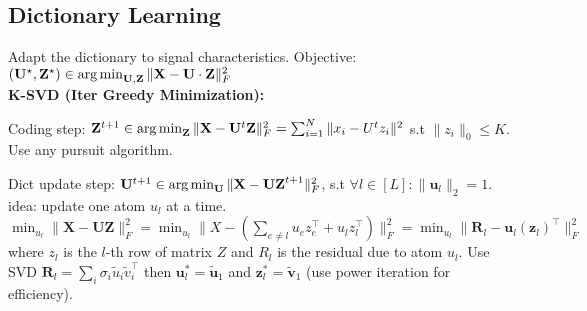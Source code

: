 \subsection*{Dictionary Learning}
Adapt the dictionary to signal characteristics. Objective: $(\mathbf{U}^\star, \mathbf{Z}^\star) \in \operatorname*{arg\,min}_\mathbf{U,Z} \| \mathbf{X} - \mathbf{U} \cdot \mathbf{Z} \|_F^2$ \\
\textbf{K-SVD (Iter Greedy Minimization):}
\begin{inparaenum}
  \item Coding step: $\mathbf{Z}^{t+1} \in \operatorname*{arg\,min}_\mathbf{Z} \| \mathbf{X} - \mathbf{U}^t \mathbf{Z} \|_F^2 = \sum_{i=1}^N \|x_i-U^tz_i \|^2$ s.t $\|z_i\|_0 \leq K$. Use any pursuit algorithm.
  \item Dict update step: $\mathbf{U}^{t+1} \in \operatorname*{arg\,min}_\mathbf{U} \| \mathbf{X} - \mathbf{UZ}^{t+1} \|_F^2$, s.t $\forall l\in [L]:\|\mathbf{u}_l\|_2 = 1$. 
   idea: update one atom $u_l$ at a time. $\min_{u_l}\|\mathbf{X} - \mathbf{U}\mathbf{Z}\|_F^2 = \min_{u_l}\|X-(\sum_{e \neq l}u_ez_e^\top + u_lz_l^\top)\|_F^2= \min_{u_l}\|\mathbf{R}_l - \mathbf{u}_l(\mathbf{z}_l)^\top\|_F^2$ where $z_l$ is the $l$-th row of matrix $Z$ and $R_l$ is the residual due to atom $u_l$. Use SVD $\mathbf{R}_l = \sum_i \sigma_i \tilde{u}_i \tilde{v}_i^\top$ then $\mathbf{u}^*_l=\tilde{\mathbf{u}}_1$ and $\mathbf{z}^*_l=\tilde{\mathbf{v}}_1$ (use power iteration for efficiency).
\end{inparaenum}
